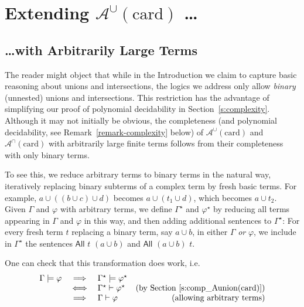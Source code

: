 \documentclass[letterpaper]{article}
\theoremstyle{definition}
\newcommand{\proves}{\vdash}
\newcommand{\Aunion}{\mathscr{A}^{\cup}}
\newcommand{\Ainter}{\mathscr{A}^{\cap}}
\newcommand{\All}[2]{\mathsf{All}\,\,#1\,\,#2}
\newcommand{\card}{\mathrm{card}}
\begin{document}
\section{Extending $\Aunion(\card)$ \ldots}

\subsection{\ldots with Arbitrarily Large Terms}

The reader might object that while in the Introduction we claim to capture basic reasoning about unions and intersections, the logics we address only allow \emph{binary} (unnested) unions and intersections. This restriction has the advantage of simplifying our proof of polynomial decidability in Section~\ref{s:complexity}. Although it may not initially be obvious, the completeness (and polynomial decidability, see Remark~\ref{remark-complexity} below) of $\Aunion(\card)$ and $\Ainter(\card)$ with arbitrarily large finite terms follows from their completeness with only binary terms.

To see this, we reduce arbitrary terms to binary terms in the natural way, iteratively replacing binary subterms of a complex term by fresh basic terms. For example, $a\cup ((b\cup c) \cup d)$ becomes $a\cup (t_1\cup d)$, which becomes $a\cup t_2$. 
Given $\Gamma$ and $\varphi$ with arbitrary terms, we define $\Gamma^\star$ and $\varphi^\star$ by reducing all terms appearing in $\Gamma$ and $\varphi$ in this way, and then adding additional sentences to $\Gamma^\star$: For every fresh term $t$ replacing a binary term, say $a \cup b$, in either $\Gamma$ \emph{or} $\varphi$, we include in $\Gamma^\star$ the sentences $\All{t}{(a \cup b)}$ and $\All{(a \cup b)}{t}$.  

One can check that this transformation does work, i.e. %
\[\begin{array}{lclr}
     \Gamma \models \varphi & 
     \implies &
     \Gamma^\star \models \varphi^\star &\\
     
     & 
     \iff &
     \Gamma^\star \proves \varphi^\star &
     \textrm{(by Section~\ref{s:comp_Aunion(card)})}\\
     
     &
     \implies &
     \Gamma \proves \varphi & \textrm{(allowing arbitrary terms)}\\
     
\end{array}
\]
\end{document}

